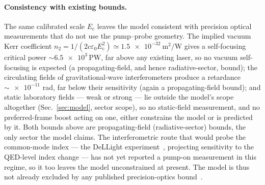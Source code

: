 \documentclass[aps,prd,twocolumn,superscriptaddress,nofootinbib,longbibliography]{revtex4-2}
\newcommand{\Ec}{E_{\mathrm{c}}}
\begin{document}
\paragraph*{Consistency with existing bounds.}
The same calibrated scale $\Ec$ leaves the model consistent with precision
optical measurements that do not use the pump--probe geometry. The implied vacuum
Kerr coefficient $n_2=1/(2c\varepsilon_0\Ec^2)\simeq\SI{1.5e-32}{\meter\squared\per\watt}$
gives a self-focusing critical power $\sim\!\num{6.5e3}\,\mathrm{PW}$, far above any
existing laser, so no vacuum self-focusing is expected (a propagating-field, and
hence radiative-sector, bound); the circulating fields of
gravitational-wave interferometers produce a retardance $\sim\!\num{e-11}$ rad, far
below their sensitivity (again a propagating-field bound); and static laboratory
fields --- weak or strong --- lie outside the model's scope altogether
(Sec.~\ref{sec:model}, sector scope), so no static-field measurement, and no
preferred-frame boost acting on one, either constrains the model or is predicted
by it. Both bounds above are propagating-field (radiative-sector) bounds, the only
sector the model claims.
The
interferometric route that would probe the common-mode index --- the DeLLight
experiment~\cite{Robertson2021DeLLight}, projecting sensitivity to the QED-level
index change --- has not yet reported a pump-on measurement in this regime, so it
too leaves the model unconstrained at present. The model is thus not already
excluded by any published precision-optics bound~\cite{Fouche2016,Robertson2021DeLLight}.
\end{document}
